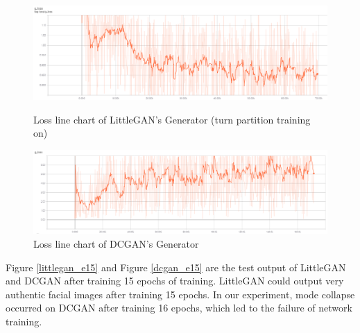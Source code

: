 \begin{figure}
    \begin{minipage}[t]{0.49\linewidth}
        \centering
        \includegraphics[width=\textwidth]{figures/loss_part_on_g.png}
        \caption{Loss line chart of LittleGAN's Generator (turn partition training on)}
        \label{loss_part_on_g}
    \end{minipage}
        \hfill
    \begin{minipage}[t]{0.49\linewidth}
        \centering
        \includegraphics[width=\textwidth]{figures/loss_dcgan_g.png}
        \caption{Loss line chart of DCGAN's Generator}
        \label{loss_dcgan_g}
    \end{minipage}
\end{figure}

Figure \ref{littlegan_e15} and Figure \ref{dcgan_e15} are the test output of LittleGAN and DCGAN after training 15 epochs of training.
LittleGAN could output very authentic facial images after training 15 epochs.
In our experiment, mode collapse occurred on DCGAN after training 16 epochs, which led to the failure of network training.

